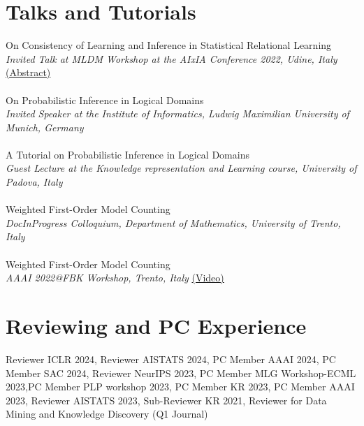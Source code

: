 \documentclass[10pt, a4paper]{article}
\newcommand{\years}[1]{\marginnote{\scriptsize #1}}
\begin{document}
\section*{Talks and Tutorials}
\years{2022}On Consistency of Learning and Inference in Statistical Relational Learning \\
\emph{Invited Talk at MLDM Workshop at the AIxIA Conference 2022, Udine, Italy }\href{https://sites.google.com/view/mldm2022/program?authuser=0}{ (Abstract)}\\ \\
\years{2022}On Probabilistic Inference in Logical Domains\\
\emph{Invited Speaker at the Institute of Informatics, Ludwig Maximilian University of Munich, Germany}\\  \\
\years{2022}A Tutorial on Probabilistic Inference in Logical Domains\\ \emph{Guest Lecture at the Knowledge representation and Learning course, University of Padova, Italy}\\ \\
\years{2022}Weighted First-Order Model Counting \\
\emph{DocInProgress Colloquium, Department of Mathematics, University of Trento, Italy} \\ \\ 
\years{2022}Weighted First-Order Model Counting\\
\emph{AAAI 2022@FBK Workshop, Trento, Italy  }\href{https://www.youtube.com/watch?v=2TRXEdq-NZg&t=3937s}{(Video)}




\section*{Reviewing and PC Experience}
Reviewer ICLR 2024, Reviewer AISTATS 2024, PC Member AAAI 2024, PC Member SAC 2024, Reviewer NeurIPS 2023, PC Member MLG Workshop-ECML 2023,PC Member PLP workshop 2023, PC Member  KR 2023, PC Member  AAAI 2023, Reviewer  AISTATS 2023, Sub-Reviewer  KR 2021, Reviewer for  Data Mining and Knowledge Discovery (Q1 Journal)
\end{document}
